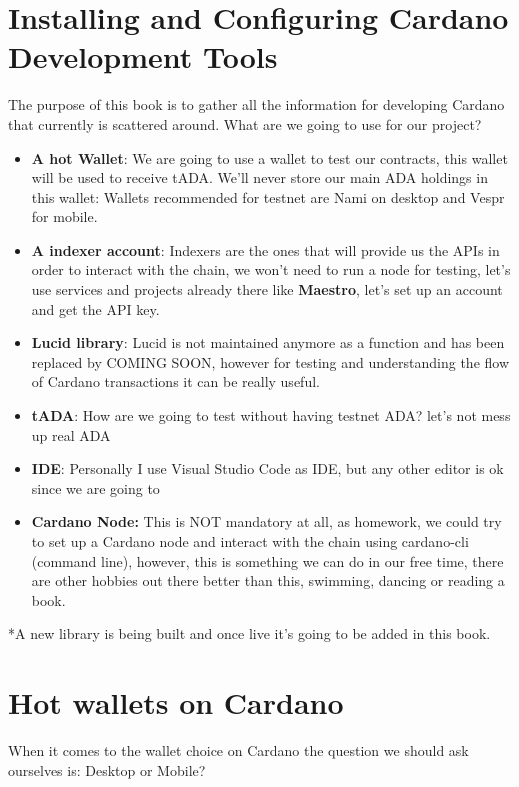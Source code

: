 \section{Installing and Configuring Cardano Development Tools}\label{sec:setup}
The purpose of this book is to gather all the information for developing Cardano that currently is scattered around.
What are we going to use for our project?


\begin{itemize}
  \item \textbf{A hot Wallet}: We are going to use a wallet to test our contracts, this wallet will be used to receive tADA. We'll never store our main ADA holdings in this wallet: Wallets recommended for testnet are Nami on desktop and  Vespr for mobile.
  \item \textbf{A indexer account}: Indexers are the ones that will provide us the APIs in order to interact with the chain, we won't need to run a node for testing, let's use services and projects already there like \textbf{Maestro}, let's set up an account and get the API key.
  \item \textbf{Lucid library}: Lucid is not maintained anymore as a function and has been replaced by COMING SOON, however for testing and understanding the flow of Cardano transactions it can be really useful.
  \item \textbf{tADA}: How are we going to test without having testnet ADA? let's not mess up real ADA
  \item  \textbf{IDE}: Personally I use Visual Studio Code as IDE, but any other editor is ok since we are going to
  \item \textbf{Cardano Node:} This is NOT mandatory at all, as homework, we could try to set up a Cardano node and interact with the chain using cardano-cli (command line), however, this is something we can do in our free time, there are other hobbies out there better than this, swimming, dancing or reading a book.
\end{itemize}

*A new library is being built and once live it's going to be added in this book.

\section{Hot wallets on Cardano}
When it comes to the wallet choice on Cardano the question we should ask ourselves is: Desktop or Mobile?


